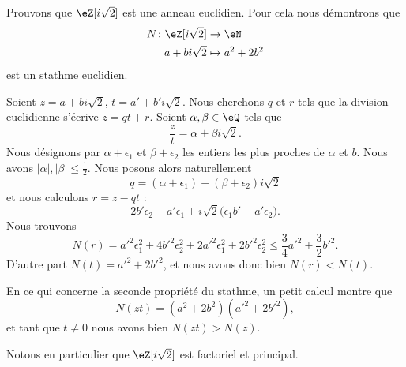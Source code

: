 \begin{example} \label{ExeDufyZI}
    Prouvons que \( \eZ[i\sqrt{2}]\) est une anneau euclidien. Pour cela nous démontrons que
    \begin{equation}
        \begin{aligned}
            N\colon \eZ[i\sqrt{2}]&\to \eN \\
            a+bi\sqrt{2}&\mapsto a^2+2b^2 
        \end{aligned}
    \end{equation}
    est un stathme euclidien.    

    Soient \( z=a+bi\sqrt{2}\), \( t=a'+b'i\sqrt{2}\). Nous cherchons \( q\) et \( r\) tels que la division euclidienne s'écrive \( z=qt+r\). Soient \( \alpha,\beta\in \eQ\) tels que 
    \begin{equation}
        \frac{ z }{ t }=\alpha+\beta i\sqrt{2}.
    \end{equation}
    Nous désignons par \( \alpha+\epsilon_1\) et \( \beta+\epsilon_2\) les entiers les plus proches de \( \alpha\) et \( b\). Nous avons \( | \alpha |,| \beta |\leq \frac{ 1 }{2}\). Nous posons alors naturellement 
    \begin{equation}
        q=(\alpha+\epsilon_1)+(\beta+\epsilon_2)i\sqrt{2}
    \end{equation}
    et nous calculons \( r=z-qt\) :
    \begin{equation}
        2b'\epsilon_2-a'\epsilon_1+i\sqrt{2}\big( \epsilon_1b'-a'\epsilon_2 \big).
    \end{equation}
    Nous trouvons 
    \begin{equation}
        N(r)=a'^2\epsilon_1^2+4b'^2\epsilon_2^2+2a'^2\epsilon_1^2+2b'^2\epsilon_2^2\leq \frac{ 3 }{ 4 }a'^2+\frac{ 3 }{2}b'^2.
    \end{equation}
    D'autre part \( N(t)=a'^2+2b'^2\), et nous avons donc bien \( N(r)<N(t)\).

    En ce qui concerne la seconde propriété du stathme, un petit calcul montre que
    \begin{equation}
        N(zt)=(a^2+2b^2)(a'^2+2b'^2),
    \end{equation}
    et tant que \( t\neq 0\) nous avons bien \( N(zt)>N(z)\).
\end{example}

Notons en particulier que \( \eZ[i\sqrt{2}]\) est factoriel et principal.

